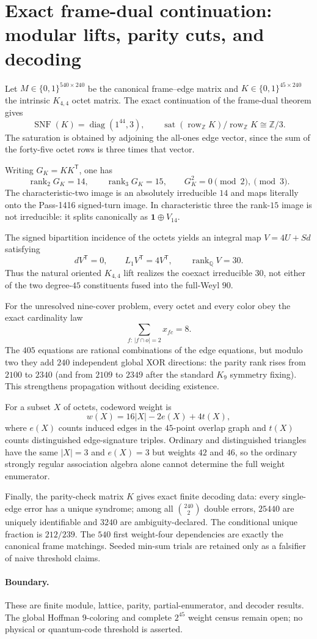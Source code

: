 \begingroup
\section*{Exact frame-dual continuation: modular lifts, parity cuts, and decoding}
Let $M\in\{0,1\}^{540\times240}$ be the canonical frame--edge matrix and
$K\in\{0,1\}^{45\times240}$ the intrinsic $K_{4,4}$ octet matrix.  The exact
continuation of the frame-dual theorem gives
\[
 \operatorname{SNF}(K)=\operatorname{diag}(1^{44},3),\qquad
 \operatorname{sat}(\operatorname{row}_{\mathbb Z}K)/
 \operatorname{row}_{\mathbb Z}K\cong\mathbb Z/3.
\]
The saturation is obtained by adjoining the all-ones edge vector, since the sum
of the forty-five octet rows is three times that vector.

Writing $G_K=KK^{\mathsf T}$, one has
\[
 \operatorname{rank}_{2}G_K=14,\qquad
 \operatorname{rank}_{3}G_K=15,\qquad
 G_K^2=0\pmod 2,\pmod 3.
\]
The characteristic-two image is an absolutely irreducible $14$ and maps
literally onto the Pass-1416 signed-turn image.  In characteristic three the
rank-$15$ image is not irreducible: it splits canonically as
$\mathbf1\oplus V_{14}$.

The signed bipartition incidence of the octets yields an integral map
$V=4U+Sd$ satisfying
\[
 dV^{\mathsf T}=0,\qquad L_1V^{\mathsf T}=4V^{\mathsf T},
 \qquad\operatorname{rank}_{\mathbb Q}V=30.
\]
Thus the natural oriented $K_{4,4}$ lift realizes the coexact irreducible
$30$, not either of the two degree-$45$ constituents fused into the full-Weyl
$90$.

For the unresolved nine-cover problem, every octet and every color obey the
exact cardinality law
\[
 \sum_{f:\,|f\cap o|=2}x_{fc}=8.
\]
The $405$ equations are rational combinations of the edge equations, but modulo
two they add $240$ independent global XOR directions: the parity rank rises
from $2100$ to $2340$ (and from $2109$ to $2349$ after the standard $K_9$
symmetry fixing).  This strengthens propagation without deciding existence.

For a subset $X$ of octets, codeword weight is
\[
 w(X)=16|X|-2e(X)+4t(X),
\]
where $e(X)$ counts induced edges in the $45$-point overlap graph and $t(X)$
counts distinguished edge-signature triples.  Ordinary and distinguished
triangles have the same $|X|=3$ and $e(X)=3$ but weights $42$ and $46$, so the
ordinary strongly regular association algebra alone cannot determine the full
weight enumerator.

Finally, the parity-check matrix $K$ gives exact finite decoding data: every
single-edge error has a unique syndrome; among all $\binom{240}{2}$ double errors,
$25440$ are uniquely identifiable and $3240$ are ambiguity-declared.  The
conditional unique fraction is $212/239$.  The $540$ first weight-four
dependencies are exactly the canonical frame matchings.  Seeded min-sum trials
are retained only as a falsifier of naive threshold claims.

\paragraph{Boundary.}
These are finite module, lattice, parity, partial-enumerator, and decoder
results.  The global Hoffman $9$-coloring and complete $2^{45}$ weight census
remain open; no physical or quantum-code threshold is asserted.
\endgroup
